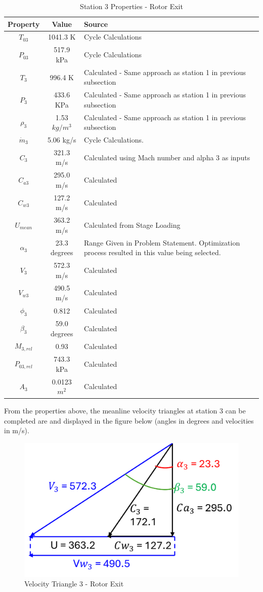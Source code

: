 \documentclass[12pt, letter]{report}
\begin{document}
\begin{table}[H]
\caption{Station 3 Properties - Rotor Exit}
\centering
\begin{tabular}{|c|c|p{}|}
\hline
\textbf{Property} & \textbf{Value} & \textbf{Source} \\ \hline
$T_{03}$ & 1041.3 K & Cycle Calculations\\ \hline
$P_{03}$ & 517.9 kPa & Cycle Calculations\\ \hline
$T_{3}$ & 996.4 K & Calculated - Same approach as station 1 in previous subsection\\ \hline
$P_{3}$ & 433.6 KPa & Calculated - Same approach as station 1 in previous subsection\\ \hline
$\rho_{3}$ & 1.53 $kg/m^3$ & Calculated - Same approach as station 1 in previous subsection\\ \hline
$\dot{m}_3$ & 5.06 kg/s & Cycle Calculations.\\ \hline
$C_3$ & 321.3 m/s & Calculated using Mach number and alpha 3 as inputs\\ \hline
$C_{a3}$ & 295.0 m/s & Calculated\\ \hline
$C_{w3}$ & 127.2 m/s & Calculated\\ \hline
$U_{mean}$ & 363.2 m/s & Calculated from Stage Loading \\ \hline
$\alpha_3$ & 23.3 degrees & Range Given in Problem Statement. Optimization process resulted in this value being selected.\\ \hline
$V_3$ & 572.3 m/s & Calculated \\ \hline
$V_{w3}$ & 490.5 m/s & Calculated\\ \hline
$\phi_3$ & 0.812 & Calculated\\ \hline
$\beta_3$ & 59.0 degrees & Calculated\\ \hline
$M_{3,rel}$ & 0.93 & Calculated\\ \hline
$P_{03,rel}$ & 743.3 kPa & Calculated\\ \hline
$A_3$ & 0.0123 $m^2$ & Calculated \\ \hline
\end{tabular}
\label{tab:my_label}
\end{table}
\par


From the properties above, the meanline velocity triangles at station 3 can be completed are and displayed in the figure below (angles in degrees and velocities in m/s).

\begin{figure}[H]
    \centering
    \includegraphics[width=0.4\linewidth]{figures/velocity_triangle_3.png}
    \caption{Velocity Triangle 3 - Rotor Exit}
    \label{fig:enter-label}
\end{figure}
\end{document}
